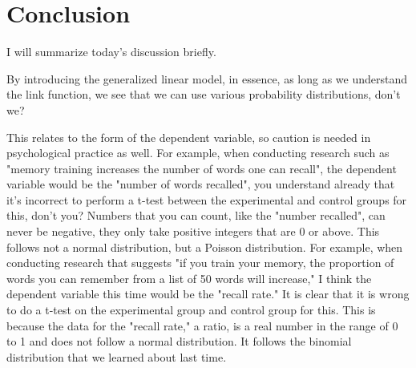 \documentclass{ltjsbook}
\begin{document}
\section{Conclusion}
I will summarize today's discussion briefly.

By introducing the generalized linear model, in essence, as long as we understand the link function, we see that we can use various probability distributions, don't we?

This relates to the form of the dependent variable, so caution is needed in psychological practice as well.
For example, when conducting research such as "memory training increases the number of words one can recall", the dependent variable would be the "number of words recalled", you understand already that it's incorrect to perform a t-test between the experimental and control groups for this, don't you? Numbers that you can count, like the "number recalled", can never be negative, they only take positive integers that are 0 or above. This follows not a normal distribution, but a Poisson distribution.
For example, when conducting research that suggests "if you train your memory, the proportion of words you can remember from a list of 50 words will increase," I think the dependent variable this time would be the "recall rate." It is clear that it is wrong to do a t-test on the experimental group and control group for this. This is because the data for the "recall rate," a ratio, is a real number in the range of 0 to 1 and does not follow a normal distribution. It follows the binomial distribution that we learned about last time.
\end{document}
